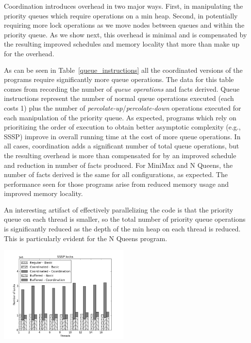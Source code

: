 Coordination introduces overhead in two major ways.  First, in
manipulating the priority queues which require operations on a min
heap.  Second, in potentially requiring more lock operations as we
move nodes between queues and within the priority queue.  As we show
next, this overhead is minimal and is compensated by the resulting improved schedules
and memory locality that more than make up for the overhead.

As can be seen in Table~\ref{queue_instructions} all the coordinated
versions of the programs require significantly more queue operations.
The data for this table comes from recording the number of \emph{queue
operations} and facts derived.
Queue instructions represent the
number of normal queue operations executed (each costs 1) plus the
number of \emph{percolate-up}/\emph{percolate-down} operations
executed for each manipulation of the priority queue.  As expected,
programs which rely on prioritizing the order of execution to obtain
better asymptotic complexity (e.g., SSSP) improve in overall running
time at the cost of more queue operations.  In all cases, coordination
adds a significant number of total queue operations, but the resulting
overhead is more than compensated for by an improved schedule and reduction
in number of facts produced. For MiniMax and N Queens, the number of facts derived
is the same for all configurations, as expected. The performance seen for those programs
arise from reduced memory usage and improved memory locality.

An interesting artifact of effectively parallelizing the code is that
the priority queue on each thread is smaller, so the total number of
priority queue operations is significantly reduced as the depth of the
min heap on each thread is reduced.  This is particularly evident for
the N Queens program.

\begin{topfig}
   \begin{center}
      \includegraphics[width=6.5cm]{results/locks/sssp-locks.png}
   \end{center}
\end{topfig}

